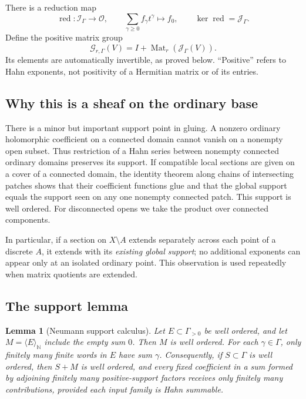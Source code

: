 \documentclass[11pt,letterpaper]{article}
\newtheorem{lemma}[lemma]{Lemma}
\theoremstyle{definition}
\theoremstyle{remark}
\newcommand{\N}{\mathbb N}
\newcommand{\OO}{\mathcal O}
\newcommand{\II}{\mathscr I_\Gamma}
\newcommand{\JJ}{\mathscr J_\Gamma}
\newcommand{\GG}{\mathscr G_{r,\Gamma}}
\newcommand{\Mat}{\operatorname{Mat}}
\newcommand{\red}{\operatorname{red}}
\newcommand{\angles}[1]{\langle #1\rangle_{\N}}
\numberwithin{equation}{section}
\begin{document}
There is a reduction map
\begin{equation}\label{eq:reduction}
 \red:\II\longrightarrow\OO,\qquad
 \sum_{\gamma\geq0}f_\gamma t^\gamma\longmapsto f_0,
 \qquad\ker\red=\JJ.
\end{equation}
Define the positive matrix group
\begin{equation}\label{eq:G}
 \GG(V)=I+\Mat_r(\JJ(V)).
\end{equation}
Its elements are automatically invertible, as proved below. ``Positive'' refers to Hahn exponents, not positivity of a Hermitian matrix or of its entries.

\subsection{Why this is a sheaf on the ordinary base}

There is a minor but important support point in gluing. A nonzero ordinary holomorphic coefficient on a connected domain cannot vanish on a nonempty open subset. Thus restriction of a Hahn series between nonempty connected ordinary domains preserves its support. If compatible local sections are given on a cover of a connected domain, the identity theorem along chains of intersecting patches shows that their coefficient functions glue and that the global support equals the support seen on any one nonempty connected patch. This support is well ordered. For disconnected opens we take the product over connected components.

In particular, if a section on $X\setminus A$ extends separately across each point of a discrete $A$, it extends with its \emph{existing global support}; no additional exponents can appear only at an isolated ordinary point. This observation is used repeatedly when matrix quotients are extended.

\subsection{The support lemma}

\begin{lemma}[Neumann support calculus]\label{lem:Neumann}
Let $E\subset\Gamma_{>0}$ be well ordered, and let $M=\angles E$ include the empty sum $0$. Then $M$ is well ordered. For each $\gamma\in\Gamma$, only finitely many finite words in $E$ have sum $\gamma$. Consequently, if $S\subset\Gamma$ is well ordered, then $S+M$ is well ordered, and every fixed coefficient in a sum formed by adjoining finitely many positive-support factors receives only finitely many contributions, provided each input family is Hahn summable.
\end{lemma}
\end{document}
